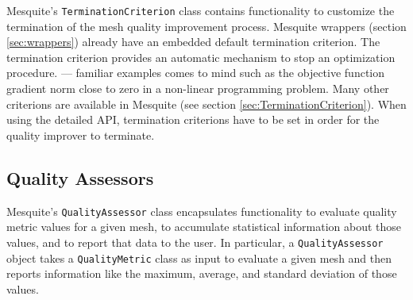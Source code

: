 \documentclass[letter]{report}
\begin{document}
Mesquite's \texttt{TerminationCriterion} class contains functionality
to customize the termination of the mesh quality improvement process. 
Mesquite wrappers (section \ref{sec:wrappers}) already have an embedded default termination
criterion. The termination criterion provides an automatic mechanism to stop an optimization
procedure. --- familiar examples  comes to mind such as the objective function gradient norm close
to zero in a non-linear programming problem. Many other criterions are available in Mesquite (see
section \ref{sec:TerminationCriterion}). When using the detailed API, termination criterions have to
be set in order for the quality improver to terminate. 
 

\subsection{Quality Assessors}

Mesquite's \texttt{QualityAssessor} class encapsulates functionality to
evaluate quality metric values for a given mesh, to accumulate
statistical information about those values, and to report that data to
the user.  In particular, a \texttt{QualityAssessor} object takes a
{\tt QualityMetric} class as input to evaluate a given mesh and then
reports information like the maximum, average, and standard deviation
of those values.

\end{document}
